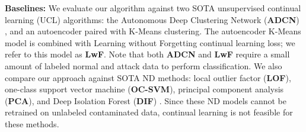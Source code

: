 \begin{table}[h]
    \caption{Selected Intrusion Datasets}
    \centering
    \label{tab:datasets}
\end{table}

\textbf{Baselines:} %
We evaluate our algorithm against two SOTA unsupervised continual learning (UCL) algorithms: the Autonomous Deep Clustering Network (\textbf{ADCN}) \cite{ashfahani2023unsupervised}, and an autoencoder paired with K-Means clustering. The autoencoder K-Means model is combined with Learning without Forgetting \cite{lwf2019Li} continual learning loss; we refer to this model as \textbf{LwF}. Note that both \textbf{ADCN} and \textbf{LwF} require a small amount of labeled normal and attack data to perform classification. We also compare our approach against SOTA ND methods: local outlier factor (\textbf{LOF})\cite{Faber_2024}, one-class support vector machine (\textbf{OC-SVM})\cite{Faber_2024}, principal component analysis (\textbf{PCA})\cite{rios2022incdfm}, and Deep Isolation Forest (\textbf{DIF}) \cite{xu2023deep}. 
Since these ND models cannot be retrained on unlabeled contaminated data, continual learning is not feasible for these methods.


